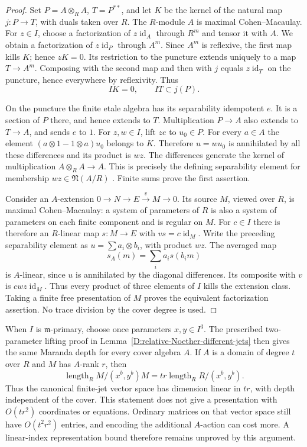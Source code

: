 \begin{proof}
Set $P=A\otimes_R A$, $T=P^{**}$, and let $K$ be the kernel of
the natural map $j:P\to T$, with duals taken over $R$.
The $R$-module $A$ is maximal Cohen--Macaulay. For $z\in I$, choose
a factorization of $z\operatorname{id}_A$ through $R^m$ and tensor
it with $A$. We obtain a factorization of $z\operatorname{id}_P$
through $A^m$. Since $A^m$ is reflexive, the first map kills $K$;
hence $zK=0$. Its restriction to the puncture extends uniquely to
a map $T\to A^m$. Composing with the second map and then with $j$
equals $z\operatorname{id}_T$ on the puncture, hence everywhere by
reflexivity. Thus
\[
 IK=0,\qquad IT\subset j(P).
\]

On the puncture the finite etale algebra has its separability
idempotent $e$. It is a section of $P$ there, and hence extends to
$T$. Multiplication $P\to A$ also extends to $T\to A$, and sends
$e$ to $1$. For $z,w\in I$, lift $ze$ to $u_0\in P$. For every
$a\in A$ the element $(a\otimes1-1\otimes a)u_0$ belongs to $K$.
Therefore $u=wu_0$ is annihilated by all these differences and its
product is $wz$. The differences generate the kernel of multiplication
$A\otimes_R A\to A$. This is precisely the defining separability
element for membership $wz\in\mathfrak N(A/R)$
\citep[Section 2, pp.~2--3]{C_IyengarTakahashiStable}. Finite sums prove
the first assertion.

Consider an $A$-extension $0\to N\to E\xrightarrow{v}M\to0$.
Its source $M$, viewed over $R$, is maximal Cohen--Macaulay: a system
of parameters of $R$ is also a system of parameters on each finite
component and is regular on $M$. For $c\in I$ there is therefore an
$R$-linear map $s:M\to E$ with $vs=c\operatorname{id}_M$.
Write the preceding separability element as
$u=\sum a_i\otimes b_i$, with product $wz$. The averaged map
\[
 s_A(m)=\sum_i a_i s(b_i m)
\]
is $A$-linear, since $u$ is annihilated by the diagonal differences.
Its composite with $v$ is $cwz\operatorname{id}_M$. Thus every product
of three elements of $I$ kills the extension class. Taking a finite
free presentation of $M$ proves the equivalent factorization assertion.
No trace division by the cover degree is used.
\end{proof}

\begin{remark}
When $I$ is $\mathfrak m$-primary, choose once parameters $x,y\in I^3$.
The prescribed two-parameter lifting proof in
Lemma~\ref{D:relative-Noether-different-jets} then gives the same
Maranda depth for every cover algebra $A$. If $A$ is a domain of
degree $t$ over $R$ and $M$ has $A$-rank $r$, then
\[
 \operatorname{length}_R M/(x^b,y^b)M
 =tr\operatorname{length}_R R/(x^b,y^b).
\]
Thus the canonical finite-jet vector space has dimension linear in
$tr$, with depth independent of the cover. This statement does not
give a presentation with $O(tr^2)$ coordinates or equations. Ordinary
matrices on that vector space still have $O(t^2r^2)$ entries, and
encoding the additional $A$-action can cost more. A linear-index
representation bound therefore remains unproved by this argument.
\end{remark}

